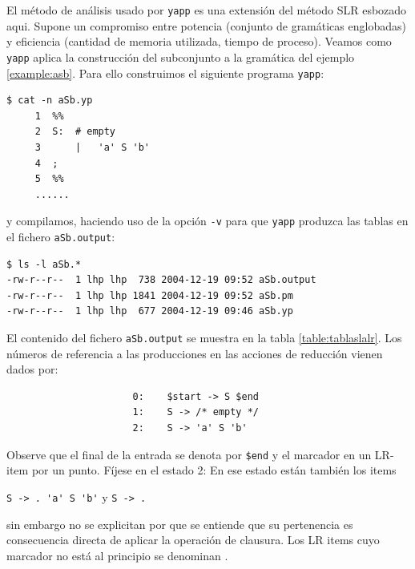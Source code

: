 El método de análisis  usado por \verb|yapp|
es una extensión del método SLR esbozado
aqui. Supone un compromiso entre potencia (conjunto de gramáticas
englobadas) y eficiencia (cantidad de memoria utilizada, tiempo de
proceso).
Veamos como \verb|yapp| aplica la construcción del subconjunto a la 
gramática del ejemplo
\ref{example:asb}.
Para ello construimos el siguiente programa \verb|yapp|:
\begin{verbatim}
$ cat -n aSb.yp
     1  %%
     2  S:  # empty
     3      |   'a' S 'b'  
     4  ;
     5  %%
     ......
\end{verbatim}
y compilamos, haciendo uso de la opción \verb|-v| para que \verb|yapp| produzca
las tablas en el fichero \verb|aSb.output|:
\begin{verbatim}
$ ls -l aSb.*
-rw-r--r--  1 lhp lhp  738 2004-12-19 09:52 aSb.output
-rw-r--r--  1 lhp lhp 1841 2004-12-19 09:52 aSb.pm
-rw-r--r--  1 lhp lhp  677 2004-12-19 09:46 aSb.yp
\end{verbatim}

El contenido del fichero \verb|aSb.output| se muestra
en la tabla 
\ref{table:tablaslalr}.
Los números de referencia a las producciones en las acciones
de reducción vienen dados por:

\begin{verbatim}
                      0:	$start -> S $end
                      1:	S -> /* empty */
                      2:	S -> 'a' S 'b'
\end{verbatim} 

Observe que el final de la entrada se denota 
por \verb|$end| y el marcador en un LR-item 
por un punto. Fíjese en el estado 2: 
En ese estado están también los items

\begin{center}
 \verb|S -> . 'a' S 'b'|
y \verb|S -> .|
\end{center}

sin embargo no se explicitan
por que se entiende que su pertenencia es
consecuencia directa de aplicar la operación 
de clausura. Los LR items cuyo marcador
no está al principio se denominan
. 

